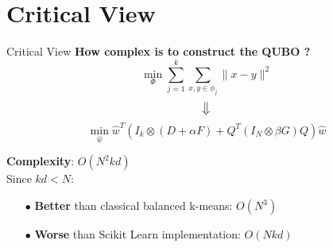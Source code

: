 \section{Critical View}
	\begin{frame}[allowframebreaks]{Critical View}
		\textbf{How complex is to construct the QUBO ?}
		$$\min _{\Phi} \sum_{j=1}^{k} \sum_{x, y \in \phi_{j}}\|x-y\|^{2}$$ $$\big\Downarrow$$ $$\min _{\hat{w}} \hat{w}^{T}\left(I_{k} \otimes(D+\alpha F)+Q^{T}\left(I_{N} \otimes \beta G\right) Q\right) \hat{w}$$ 
		
		\textbf{Complexity}: $O(N^2kd)$ \\
		Since $kd < N$:
		\begin{itemize}
			\item[$\bullet$] \textbf{Better} than classical balanced k-means: $O(N^3)$
			\item[$\bullet$] \textbf{Worse} than Scikit Learn implementation: $O(Nkd)$  
		\end{itemize}
		

\end{frame}
